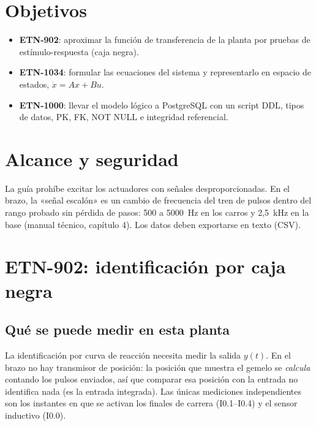 \documentclass[a4paper,11pt]{article}
\begin{document}

\tableofcontents
\newpage

\section{Objetivos}
\begin{itemize}
\item \textbf{ETN-902}: aproximar la función de transferencia de la planta por pruebas de estímulo-respuesta (caja negra).
\item \textbf{ETN-1034}: formular las ecuaciones del sistema y representarlo en espacio de estados, $\dot{x} = Ax + Bu$.
\item \textbf{ETN-1000}: llevar el modelo lógico a PostgreSQL con un script DDL, tipos de datos, PK, FK, NOT NULL e integridad referencial.
\end{itemize}

\section{Alcance y seguridad}
La guía prohíbe excitar los actuadores con señales desproporcionadas. En el brazo, la «señal escalón» es un cambio de frecuencia del tren de pulsos dentro del rango probado sin pérdida de pasos: 500 a 5000~Hz en los carros y 2,5~kHz en la base (manual técnico, capítulo 4). Los datos deben exportarse en texto (CSV).

\section{ETN-902: identificación por caja negra}
\subsection{Qué se puede medir en esta planta}
La identificación por curva de reacción necesita medir la salida $y(t)$. En el brazo no hay transmisor de posición: la posición que muestra el gemelo se \emph{calcula} contando los pulsos enviados, así que comparar esa posición con la entrada no identifica nada (es la entrada integrada). Las únicas mediciones independientes son los instantes en que se activan los finales de carrera (I0.1--I0.4) y el sensor inductivo (I0.0).
\end{document}
